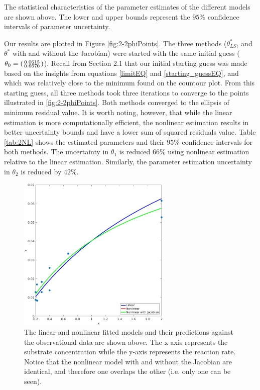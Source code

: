 \begin{table}[htb]
\centering
\small

\caption{The statistical characteristics of the parameter estimates of the different models are shown above. The lower and upper bounds represent the $95\%$ confidence intervals of parameter uncertainty.}
\label{tab:2NL}
\end{table}

Our results are plotted in Figure \ref{fig:2-2phiPoints}. The three methods ($\theta^{*}_{LS}$, and $\theta^*$ with and without the Jacobian) were started with the same initial guess ($\theta_0 = \begin{psmallmatrix}
0.0615 \\ 0.6670
\end{psmallmatrix}$). Recall from Section 2.1 that our initial starting guess was made based on the insights from equations \ref{limitEQ} and \ref{starting_guessEQ}, and which was relatively close to the minimum found on the countour plot. From this starting guess, all three methods took three iterations to converge to the points illustrated in \ref{fig:2-2phiPoints}. Both methods converged to the ellipsis of minimum residual value. It is worth noting, however, that while the linear estimation is more computationally efficient, the nonlinear estimation results in better uncertainty bounds and have a lower sum of squared residuals value. Table \ref{tab:2NL} shows the estimated parameters and their $95\%$ confidence intervals for both methods. The uncertainty in $\theta_1$ is reduced $66\%$ using nonlinear estimation relative to the linear estimation. Similarly, the parameter estimation uncertainty in $\theta_2$ is reduced by $42\%$. 

\begin{figure}[htb]
\centering
\includegraphics[width=0.65\textwidth]{../img/2-2est}
\caption{The linear and nonlinear fitted models and their predictions against the observational data are shown above. The x-axis represents the substrate concentration while the y-axis represents the reaction rate. Notice that the nonlinear model with and without the Jacobian are identical, and therefore one overlaps the other (i.e. only one can be seen).}
\label{fig:2-2est}
\end{figure}

